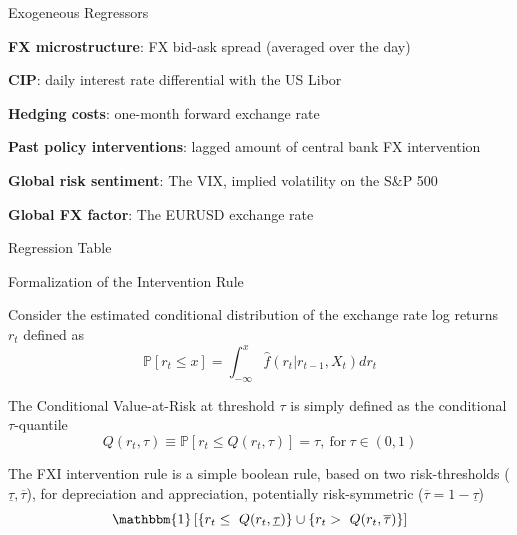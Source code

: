 \documentclass{beamer}
\newenvironment{wideitemize}{\itemize\addtolength{\itemsep}{10pt}}{\enditemize}
\newenvironment{wideenumerate}{\enumerate\addtolength{\itemsep}{10pt}}{\endenumerate}
\begin{document}
\begin{frame}{Exogeneous Regressors}
  \begin{wideenumerate}
  \item \textbf{FX microstructure}: FX bid-ask spread (averaged over the day)
  \item \textbf{CIP}: daily interest rate differential with the US Libor 
  \item \textbf{Hedging costs}: one-month forward exchange rate
  \item \textbf{Past policy interventions}: lagged amount of central bank FX intervention 
  \item \textbf{Global risk sentiment}: The VIX, implied volatility on the S\&P 500 
  \item \textbf{Global FX factor}: The EURUSD exchange rate
  \end{wideenumerate}
 
\end{frame}


\begin{frame}{Regression Table}
\setlength\tabcolsep{2pt}  %
\tiny  %

\normalsize
\end{frame}

\begin{frame}{Formalization of the Intervention Rule}
  \begin{wideitemize}
    \item Consider the estimated conditional distribution of the exchange rate log
      returns $r_t$ defined as
      \begin{equation*}
      \mathbb{P}[r_t \leq x] = \int_{-\infty}^{x}\hat{f}(r_t | r_{t-1}, X_t)
      dr_t        
      \end{equation*}
    \item The Conditional Value-at-Risk at threshold $\tau$ is simply defined as
      the conditional $\tau$-quantile
      \begin{equation*}
      Q(r_t, \tau) \equiv  \mathbb{P}[r_t
      \leq Q(r_t, \tau)] = \tau, \ \text{for} \ \tau \in (0,1)
      \end{equation*}        
    \item The FXI intervention rule is a simple boolean rule, based on two
      risk-thresholds ($\underline{\tau}, \overline{\tau}$), for depreciation
      and appreciation, potentially risk-symmetric ($\overline{\tau} = 1 - \underline{\tau}$)
      \begin{equation*}
\mathbbm{1} \left[ \{r_t \leq \ Q(r_t, \underline{\tau})\} \cup \{r_t > \
  Q(r_t, \overline{\tau})\} \right]
      \end{equation*}                
  \end{wideitemize}
  
\end{frame}
\end{document}

